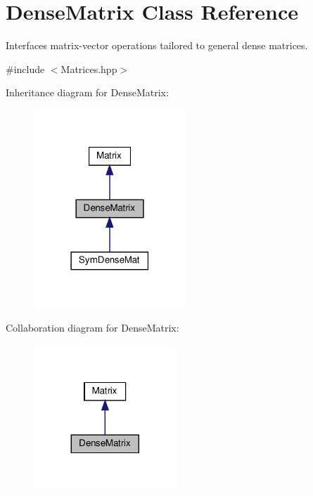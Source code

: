 \hypertarget{class_dense_matrix}{}\section{Dense\+Matrix Class Reference}
\label{class_dense_matrix}


Interfaces matrix-\/vector operations tailored to general dense matrices.  




{\ttfamily \#include $<$Matrices.\+hpp$>$}



Inheritance diagram for Dense\+Matrix\+:
\nopagebreak
\begin{figure}[H]
\begin{center}
\leavevmode
\includegraphics[width=162pt]{class_dense_matrix__inherit__graph}
\end{center}
\end{figure}


Collaboration diagram for Dense\+Matrix\+:
\nopagebreak
\begin{figure}[H]
\begin{center}
\leavevmode
\includegraphics[width=152pt]{class_dense_matrix__coll__graph}
\end{center}
\end{figure}
